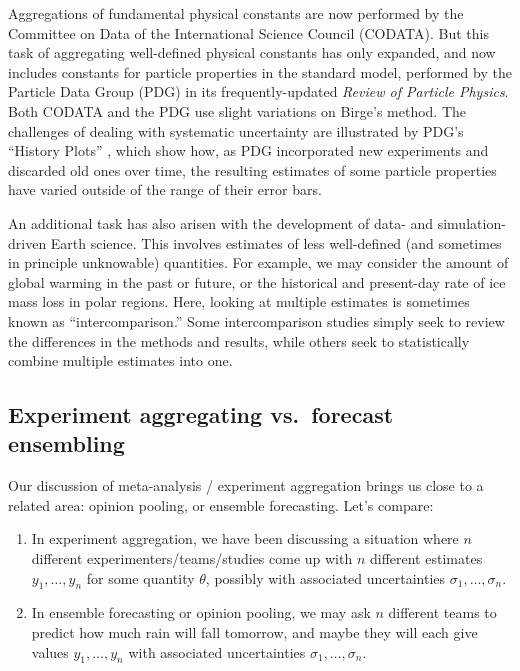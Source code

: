 \documentclass[12pt]{article}
\begin{document}
Aggregations of fundamental physical constants are now performed by the Committee on Data of the International Science Council (CODATA). But this task of aggregating well-defined physical constants has only expanded, and now includes constants for particle properties in the standard model, performed by the Particle Data Group (PDG) in its frequently-updated \textit{Review of Particle Physics}. Both CODATA and the PDG use slight variations on Birge's method. The challenges of dealing with systematic uncertainty are illustrated by PDG's ``History Plots'' \citep[pg. 19, Figure 1]{navas2024review}, which show how, as PDG incorporated new experiments and discarded old ones over time, the resulting estimates of some particle properties have varied outside of the range of their error bars.

An additional task has also arisen with the development of data- and simulation-driven Earth science. This involves estimates of less well-defined (and sometimes in principle unknowable) quantities. For example, we may consider the amount of global warming in the past or future, or the historical and present-day rate of ice mass loss in polar regions. Here, looking at multiple estimates is sometimes known as ``intercomparison.'' Some intercomparison studies simply seek to review the differences in the methods and results, while others seek to statistically combine multiple estimates into one.

\subsection{Experiment aggregating vs.~forecast ensembling}

Our discussion of meta-analysis / experiment aggregation brings us close to a related area: opinion pooling, or ensemble forecasting. Let's compare:

\begin{enumerate}
\item
  In experiment aggregation, we have been discussing a situation where $n$ different experimenters/teams/studies come up with $n$ different estimates $y_1,\ldots,y_n$ for some quantity $\theta$, possibly with associated uncertainties $\sigma_1,\ldots,\sigma_n$.
\item
  In ensemble forecasting or opinion pooling, we may ask $n$ different teams to predict how much rain will fall tomorrow, and maybe they will each give values $y_1,\ldots,y_n$ with associated uncertainties $\sigma_1,\ldots,\sigma_n$.
\end{enumerate}
\end{document}
